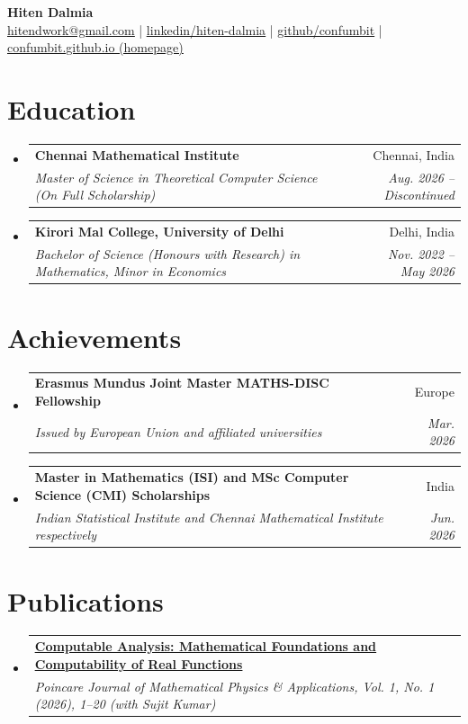 \documentclass[letterpaper,11pt]{article}
\makeatletter
\newcommand{\resumeSubheading}[4]{
  \vspace{-2pt}\item
    \begin{tabular*}{0.97\textwidth}[t]{l@{\extracolsep{\fill}}r}
      \textbf{#1} & #2 \\
      \textit{\small#3} & \textit{\small #4} \\
    \end{tabular*}\vspace{-7pt}
}
\newcommand{\resumeSubHeadingListStart}{\begin{itemize}[leftmargin=0.15in, label={}]}
\newcommand{\resumeSubHeadingListEnd}{\end{itemize}}
\makeatother
\begin{document}
\begin{center}
  \textbf{\Huge Hiten Dalmia} \\ \vspace{1pt}
  \small \href{mailto:hitendwork@gmail.com}{\underline{hitendwork@gmail.com}} |
  \href{https://www.linkedin.com/in/hiten-dalmia/}{\underline{linkedin/hiten-dalmia}} |
  \href{https://github.com/confumbit}{\underline{github/confumbit}} |
  \href{https://confumbit.github.io/index.html}{\underline{confumbit.github.io (homepage)}}
\end{center}


\section{Education}
\resumeSubHeadingListStart
\resumeSubheading
{Chennai Mathematical Institute}{Chennai, India}
{Master of Science in Theoretical Computer Science (On Full Scholarship)}{Aug. 2026 -- Discontinued}

\resumeSubheading
{Kirori Mal College, University of Delhi}{Delhi, India}
{Bachelor of Science (Honours with Research) in Mathematics, \footnotesize{Minor in Economics}}{Nov. 2022 -- May 2026}
\resumeSubHeadingListEnd



\section{Achievements}
\resumeSubHeadingListStart
\resumeSubheading
{Erasmus Mundus Joint Master MATHS-DISC Fellowship}{Europe}
{Issued by European Union and affiliated universities}{Mar. 2026}
\resumeSubheading
{Master in Mathematics (ISI) and MSc Computer Science (CMI) Scholarships}{India}
{Indian Statistical Institute and Chennai Mathematical Institute respectively}{Jun. 2026}

\resumeSubHeadingListEnd

\section{Publications}

\resumeSubHeadingListStart
\resumeSubheading
{\href{https://doi.org/10.46753/pjmpa.2026.v01i01.001}{\underline{\textbf{Computable Analysis: Mathematical Foundations and Computability of Real Functions}}}}{}
{Poincare Journal of Mathematical Physics \& Applications, Vol. 1, No. 1 (2026), 1--20 (with Sujit Kumar)}{}
\resumeSubHeadingListEnd

\end{document}
